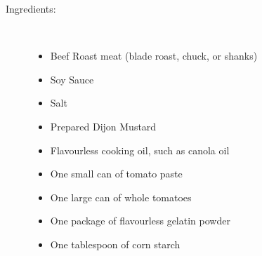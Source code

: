 \documentclass[11pt,letterpaper]{article}
\begin{document}
\begin{description}

\item[Ingredients:]\ \\
	\begin{itemize}
	\item Beef Roast meat (blade roast, chuck, or shanks)
	\item Soy Sauce
	\item Salt
	\item Prepared Dijon Mustard
	\item Flavourless cooking oil, such as canola oil
	\item One small can of tomato paste
	\item One large can of whole tomatoes
	\item One package of flavourless gelatin powder
	\item One tablespoon of corn starch
	\end{itemize}


\end{description}
\end{document}
